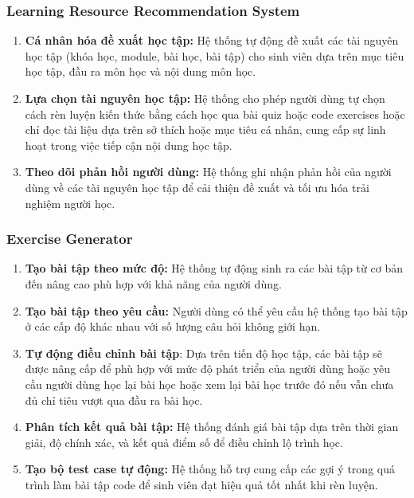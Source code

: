 \subsubsection{Learning Resource Recommendation System}
\begin{enumerate}
\item \textbf{Cá nhân hóa đề xuất học tập:} Hệ thống tự động đề xuất các tài nguyên học tập (khóa học, module, bài học, bài tập) cho sinh viên dựa trên mục tiêu học tập, đầu ra môn học và nội dung môn học.
\item \textbf{Lựa chọn tài nguyên học tập:} Hệ thống cho phép người dùng tự chọn cách rèn luyện kiến thức bằng cách học qua bài quiz hoặc code exercises hoặc chỉ đọc tài liệu dựa trên sở thích hoặc mục tiêu cá nhân, cung cấp sự linh hoạt trong việc tiếp cận nội dung học tập.
\item \textbf{Theo dõi phản hồi người dùng:} Hệ thống ghi nhận phản hồi của người dùng về các tài nguyên học tập để cải thiện đề xuất và tối ưu hóa trải nghiệm người học.
\end{enumerate}
\subsubsection{Exercise Generator}
\begin{enumerate}
    \item \textbf{Tạo bài tập theo mức độ:} Hệ thống tự động sinh ra các bài tập từ cơ bản đến nâng cao phù hợp với khả năng của người dùng.
    \item \textbf{Tạo bài tập theo yêu cầu:} Người dùng có thể yêu cầu hệ thống tạo bài tập ở các cấp độ khác nhau với số lượng câu hỏi không giới hạn.
\item \textbf{Tự động điều chỉnh bài tập}: Dựa trên tiến độ học tập, các bài tập sẽ được nâng cấp để phù hợp với mức độ phát triển của người dùng hoặc yêu cầu người dùng học lại bài học hoặc xem lại bài học trước đó nếu vẫn chưa đủ chỉ tiêu vượt qua đầu ra bài học.
\item \textbf{Phân tích kết quả bài tập:} Hệ thống đánh giá bài tập dựa trên thời gian giải, độ chính xác, và kết quả điểm số để điều chỉnh lộ trình học.
\item \textbf{Tạo bộ test case tự động:} Hệ thống hỗ trợ cung cấp các gợi ý trong quá trình làm bài tập code để sinh viên đạt hiệu quả tốt nhất khi rèn luyện.
\end{enumerate}
